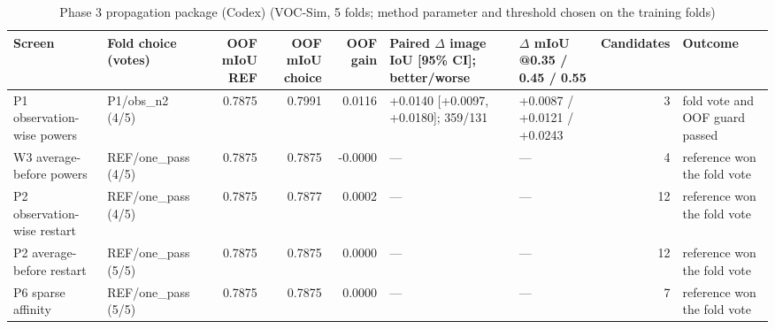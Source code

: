 \begin{table}[H]\centering\scriptsize\setlength{\tabcolsep}{3pt}
\begin{tabular}{>{\raggedright\arraybackslash}p{1.40cm}>{\raggedright\arraybackslash}p{1.40cm}rrr>{\raggedright\arraybackslash}p{1.51cm}>{\raggedright\arraybackslash}p{1.40cm}r>{\raggedright\arraybackslash}p{1.40cm}}
\toprule
Screen & Fold choice (votes) & OOF mIoU REF & OOF mIoU choice & OOF gain & Paired $\Delta$ image IoU [95\% CI]; better/\allowbreak{}worse & $\Delta$ mIoU @0.35 /\allowbreak{} 0.45 /\allowbreak{} 0.55 & Candidates & Outcome \\
\midrule
P1 observation-wise powers & P1/\allowbreak{}obs\_\allowbreak{}n2 (4/\allowbreak{}5) & 0.7875 & 0.7991 & 0.0116 & +0.0140 [+0.0097, +0.0180]; 359/\allowbreak{}131 & +0.0087 /\allowbreak{} +0.0121 /\allowbreak{} +0.0243 & 3 & fold vote and OOF guard passed \\
W3 average-before powers & REF/\allowbreak{}one\_\allowbreak{}pass (4/\allowbreak{}5) & 0.7875 & 0.7875 & -0.0000 & --- & --- & 4 & reference won the fold vote \\
P2 observation-wise restart & REF/\allowbreak{}one\_\allowbreak{}pass (4/\allowbreak{}5) & 0.7875 & 0.7877 & 0.0002 & --- & --- & 12 & reference won the fold vote \\
P2 average-before restart & REF/\allowbreak{}one\_\allowbreak{}pass (5/\allowbreak{}5) & 0.7875 & 0.7875 & 0.0000 & --- & --- & 12 & reference won the fold vote \\
P6 sparse affinity & REF/\allowbreak{}one\_\allowbreak{}pass (5/\allowbreak{}5) & 0.7875 & 0.7875 & 0.0000 & --- & --- & 7 & reference won the fold vote \\
\bottomrule
\end{tabular}
\caption{Phase 3 propagation package (Codex) (VOC-Sim, 5 folds; method parameter and threshold chosen on the training folds)}\label{tab:a8_cv_summary}
\end{table}
